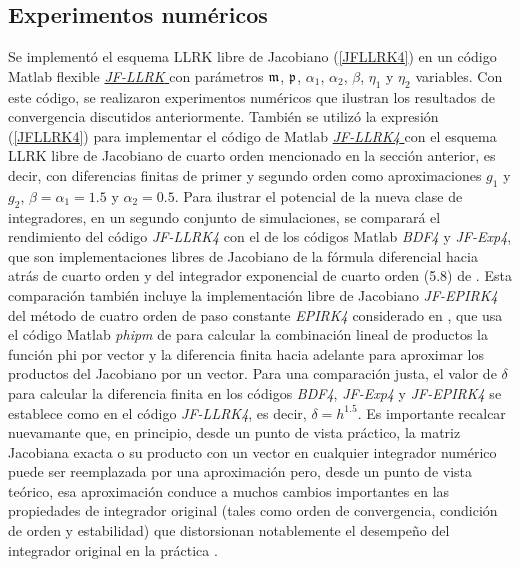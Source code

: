 \subsection{Experimentos numéricos}
Se implementó el esquema LLRK libre de Jacobiano (\ref{JFLLRK4}) en un código Matlab flexible \href{https://github.com/fsadannn/HOLLmethods}{{\textit{JF-LLRK} \faExternalLink}} con parámetros $\mathfrak{m}$, $\mathfrak{p}$, $\alpha_1$, $\alpha_2$, $\beta$, $\eta_1$ y $\eta_2$ variables. Con este código, se realizaron experimentos numéricos que ilustran los resultados de convergencia discutidos anteriormente. También se utilizó la expresión (\ref{JFLLRK4}) para implementar el código de Matlab \href{https://github.com/fsadannn/HOLLmethods}{{\textit{JF-LLRK4} \faExternalLink}} con el esquema LLRK libre de Jacobiano de cuarto orden mencionado en la sección anterior, es decir, con diferencias finitas de primer y segundo orden como aproximaciones $g_1$ y $g_2$, $\beta=\alpha_1=1\mathord{.}5$ y $\alpha_2=0\mathord{.}5$. Para ilustrar el potencial de la nueva clase de integradores, en un segundo conjunto de simulaciones, se comparará el rendimiento del código \textit{JF-LLRK4} con el de los códigos Matlab \textit{BDF4} y \textit{JF-Exp4}, que son implementaciones libres de Jacobiano de la fórmula diferencial hacia atrás de cuarto orden \cite{hairer1993solving} y del integrador exponencial de cuarto orden (5.8) de \cite{hochbruck1998exponential}. Esta comparación también incluye la implementación libre de Jacobiano \textit{JF-EPIRK4} del método de cuatro orden de paso constante \textit{EPIRK4} \cite{rainwater2016new} considerado en \cite{einkemmer2017performance}, que usa el código Matlab \textit {phipm} de \cite{niesen2012algorithm} para calcular la combinación lineal de productos  la función phi por vector y la diferencia finita hacia adelante para aproximar los productos del Jacobiano por un vector. Para una comparación justa, el valor de $\delta$ para calcular la diferencia finita en los códigos \textit{BDF4}, \textit{JF-Exp4} y \textit{JF-EPIRK4} se establece como en el código \textit {JF-LLRK4}, es decir, $\delta=h^{1\mathord{.}5}$. Es importante recalcar nuevamante que, en principio, desde un punto de vista práctico, la matriz Jacobiana exacta o su producto con un vector en cualquier integrador numérico puede ser reemplazada por una aproximación pero, desde un punto de vista teórico, esa aproximación conduce a muchos cambios importantes en las propiedades de integrador original (tales como orden de convergencia, condición de orden y estabilidad) que distorsionan notablemente el desempeño del integrador original en la práctica \cite{hairer1993solving,hochbruck1998exponential, tranquilli2014rosenbrock}. 